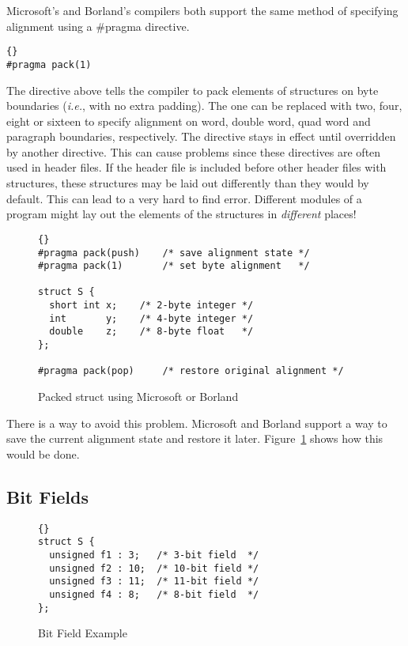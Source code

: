 Microsoft's and Borland's compilers both support the same method of specifying
alignment using a {\code \#pragma} directive.
\begin{lstlisting}[stepnumber=0]{}
#pragma pack(1)
\end{lstlisting}
The directive above tells the compiler to pack elements of structures
on byte boundaries (\emph{i.e.}, with no extra padding). The one can
be replaced with two, four, eight or sixteen to specify alignment on
word, double word, quad word and paragraph boundaries,
respectively. The directive stays in effect until overridden by
another directive. This can cause problems since these directives are
often used in header files. If the header file is included before
other header files with structures, these structures may be laid out
differently than they would by default. This can lead to a very hard to
find error. Different modules of a program might lay out the elements
of the structures in \emph{different} places!

\begin{figure}[t]
\begin{lstlisting}[frame=tlrb,stepnumber=0]{}
#pragma pack(push)    /* save alignment state */
#pragma pack(1)       /* set byte alignment   */

struct S {
  short int x;    /* 2-byte integer */
  int       y;    /* 4-byte integer */
  double    z;    /* 8-byte float   */
};

#pragma pack(pop)     /* restore original alignment */
\end{lstlisting}
\caption{Packed struct using Microsoft or Borland \label{fig:msPacked}}
\end{figure}

There is a way to avoid this problem. Microsoft and Borland support a
way to save the current alignment state and restore it
later. Figure~\ref{fig:msPacked} shows how this would be done.

\subsection{Bit Fields}

\begin{figure}[t]
\begin{lstlisting}[frame=tlrb,stepnumber=0]{}
struct S {
  unsigned f1 : 3;   /* 3-bit field  */
  unsigned f2 : 10;  /* 10-bit field */
  unsigned f3 : 11;  /* 11-bit field */
  unsigned f4 : 8;   /* 8-bit field  */
};
\end{lstlisting}
\caption{Bit Field Example \label{fig:bitStruct}}
\end{figure}

